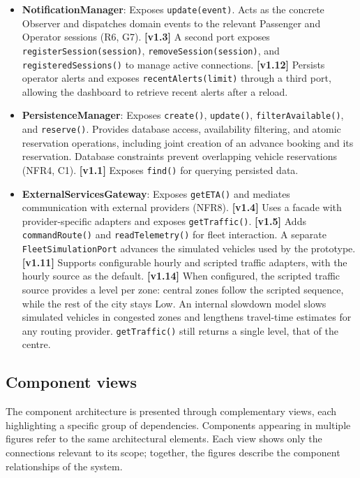 \documentclass[11pt,a4paper,oneside]{report}
\newcommand{\code}[1]{\texttt{#1}}
\begin{document}
\begin{itemize}
\item
  \textbf{NotificationManager}: Exposes \code{update(event)}.
  Acts as the concrete Observer and dispatches domain events
  to the relevant Passenger and Operator sessions (R6, G7).
  \textbf{[v1.3]} A second port exposes
  \code{registerSession(session)}, \code{removeSession(session)},
  and \code{registeredSessions()} to manage active connections.
  \textbf{[v1.12]} Persists operator alerts and exposes
  \code{recentAlerts(limit)} through a third port, allowing
  the dashboard to retrieve recent alerts after a reload.

\item
  \textbf{PersistenceManager}: Exposes \code{create()},
  \code{update()}, \code{filterAvailable()}, and \code{reserve()}.
  Provides database access, availability filtering, and atomic
  reservation operations, including joint creation of an advance
  booking and its reservation. Database constraints prevent
  overlapping vehicle reservations (NFR4, C1).
  \textbf{[v1.1]} Exposes \code{find()} for querying persisted data.

\item
  \textbf{ExternalServicesGateway}: Exposes \code{getETA()}
  and mediates communication with external providers (NFR8).
  \textbf{[v1.4]} Uses a facade with provider-specific adapters
  and exposes \code{getTraffic()}.
  \textbf{[v1.5]} Adds \code{commandRoute()} and
  \code{readTelemetry()} for fleet interaction.
  A separate \code{FleetSimulationPort} advances the simulated
  vehicles used by the prototype.
  \textbf{[v1.11]} Supports configurable hourly and scripted
  traffic adapters, with the hourly source as the default.
  \textbf{[v1.14]} When configured, the scripted traffic source provides
  a level per zone: central zones follow the scripted sequence, while the
  rest of the city stays Low. An internal slowdown model slows simulated
  vehicles in congested zones and lengthens travel-time estimates for any
  routing provider. \code{getTraffic()} still returns a single level,
  that of the centre.

\end{itemize}

\subsection{Component views}
\label{component-views}

The component architecture is presented through complementary views,
each highlighting a specific group of dependencies. Components appearing
in multiple figures refer to the same architectural elements. Each view
shows only the connections relevant to its scope; together, the figures
describe the component relationships of the system.
\end{document}
